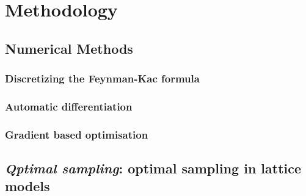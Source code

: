 
\chapter{Methodology}
\label{chapter3}

\ifpdf
    \graphicspath{{Chapter3/Figs/Raster/}{Chapter3/Figs/PDF/}{Chapter3/Figs/}}
\else
    \graphicspath{{Chapter3/Figs/Vector/}{Chapter3/Figs/}}
\fi

\section{Numerical Methods}
\label{sec:numerics}


\subsection{Discretizing the Feynman-Kac formula}
\label{subsec:fkac-disc}

\subsection{Automatic differentiation}
\label{subsec:numerics-autograd}

\subsection{Gradient based optimisation}
\label{subsec:numerics-gbopt}


\section[\emph{Qptimal sampling}]{\emph{Qptimal sampling}: optimal sampling in lattice models}